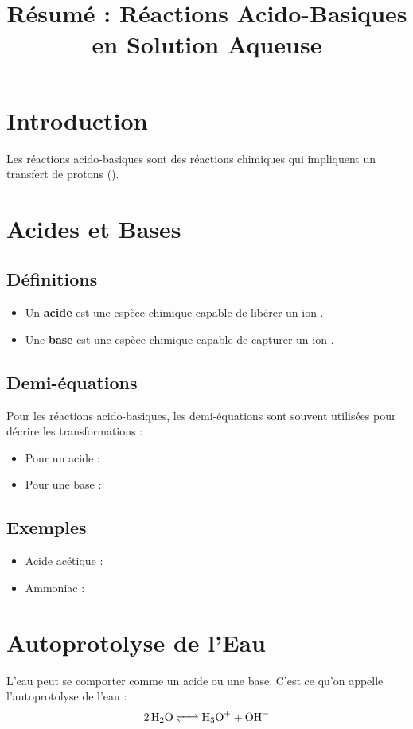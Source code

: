 \documentclass[12pt]{article}
\title{Résumé : Réactions Acido-Basiques en Solution Aqueuse}
\author{}
\date{}
\begin{document}
\maketitle

\section{Introduction}
Les réactions acido-basiques sont des réactions chimiques qui impliquent un transfert de protons ().

\section{Acides et Bases}
\subsection{Définitions}
\begin{itemize}
    \item Un \textbf{acide} est une espèce chimique capable de libérer un ion .
    \item Une \textbf{base} est une espèce chimique capable de capturer un ion .
\end{itemize}

\subsection{Demi-équations}
Pour les réactions acido-basiques, les demi-équations sont souvent utilisées pour décrire les transformations :
\begin{itemize}
    \item Pour un acide : 
    \item Pour une base : 
\end{itemize}

\subsection{Exemples}
\begin{itemize}
    \item Acide acétique : 
    \item Ammoniac : 
\end{itemize}

\section{Autoprotolyse de l'Eau}
L'eau peut se comporter comme un acide ou une base. C'est ce qu'on appelle l'autoprotolyse de l'eau :
\[
\ce{2 H2O <=> H3O+ + OH-}
\]
\end{document}
